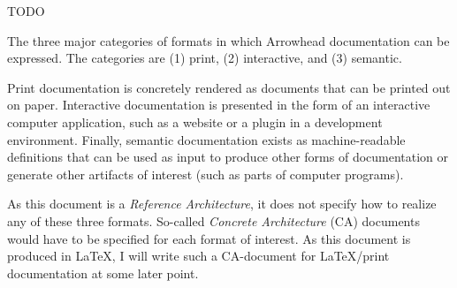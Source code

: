 %
%

TODO

The three major categories of formats in which Arrowhead documentation can be expressed.
The categories are (1) print, (2) interactive, and (3) semantic.

Print documentation is concretely rendered as documents that can be printed out on paper.
Interactive documentation is presented in the form of an interactive computer application, such as a website or a plugin in a development environment.
Finally, semantic documentation exists as machine-readable definitions that can be used as input to produce other forms of documentation or generate other artifacts of interest (such as parts of computer programs).

As this document is a \textit{Reference Architecture}, it does not specify how to realize any of these three formats.
So-called \textit{Concrete Architecture} (CA) documents would have to be specified for each format of interest.
As this document is produced in LaTeX, I will write such a CA-document for LaTeX/print documentation at some later point.